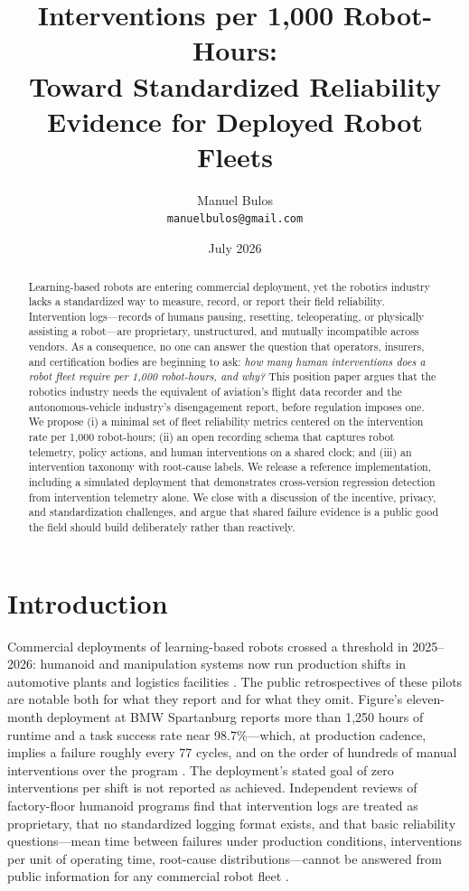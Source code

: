 \documentclass[11pt]{article}
\title{Interventions per 1,000 Robot-Hours:\\
Toward Standardized Reliability Evidence for Deployed Robot Fleets}
\author{
  Manuel Bulos\\
  \texttt{manuelbulos@gmail.com}
}
\date{July 2026}
\begin{document}
\maketitle

\begin{abstract}
Learning-based robots are entering commercial deployment, yet the robotics
industry lacks a standardized way to measure, record, or report their field
reliability. Intervention logs---records of humans pausing, resetting,
teleoperating, or physically assisting a robot---are proprietary,
unstructured, and mutually incompatible across vendors. As a consequence, no
one can answer the question that operators, insurers, and certification
bodies are beginning to ask: \emph{how many human interventions does a robot
fleet require per 1,000 robot-hours, and why?} This position paper argues
that the robotics industry needs the equivalent of aviation's flight data
recorder and the autonomous-vehicle industry's disengagement report, before
regulation imposes one. We propose (i) a minimal set of fleet reliability
metrics centered on the intervention rate per 1,000 robot-hours; (ii) an
open recording schema that captures robot telemetry, policy actions, and
human interventions on a shared clock; and (iii) an intervention taxonomy
with root-cause labels. We release a reference implementation, including a
simulated deployment that demonstrates cross-version regression detection
from intervention telemetry alone. We close with a discussion of the
incentive, privacy, and standardization challenges, and argue that shared
failure evidence is a public good the field should build deliberately rather
than reactively.
\end{abstract}

\section{Introduction}

Commercial deployments of learning-based robots crossed a threshold in
2025--2026: humanoid and manipulation systems now run production shifts in
automotive plants and logistics facilities \citep{figure2026bmw,
agility2025gxo}. The public retrospectives of these pilots are notable both
for what they report and for what they omit. Figure's eleven-month
deployment at BMW Spartanburg reports more than 1,250 hours of runtime and a
task success rate near 98.7\%---which, at production cadence, implies a
failure roughly every 77 cycles, and on the order of hundreds of manual
interventions over the program \citep{figure2026bmw, ifactory2026bmw}. The
deployment's stated goal of zero interventions per shift is not reported as
achieved. Independent reviews of factory-floor humanoid programs find that
intervention logs are treated as proprietary, that no standardized logging
format exists, and that basic reliability questions---mean time between
failures under production conditions, interventions per unit of operating
time, root-cause distributions---cannot be answered from public information
for any commercial robot fleet \citep{karp2026reality}.
\end{document}
